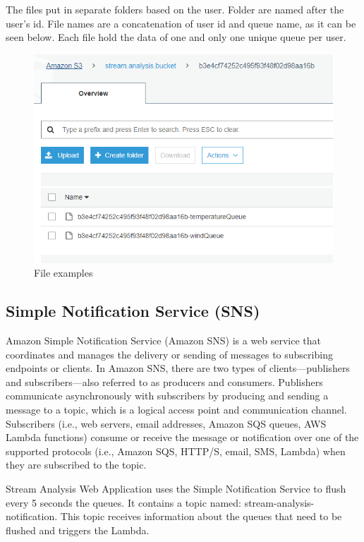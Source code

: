 The files put in separate folders based on the user. Folder are named after the user's id. File names are a concatenation of user id and queue name, as it can be seen below. Each file hold the data of one and only one unique queue per user.

\begin{figure}[h]
	\centering
	\includegraphics[width=1\linewidth]{./images/aws_resources/S3Files.PNG}
	\caption{File examples}
	\label{fig:s3Files}
\end{figure}

\newpage

\subsection{Simple Notification Service (SNS)}
\label{chap:04:03:06}

Amazon Simple Notification Service (Amazon SNS) is a web service that coordinates and manages the delivery or sending of messages to subscribing endpoints or clients. In Amazon SNS, there are two types of clients—publishers and subscribers—also referred to as producers and consumers. Publishers communicate asynchronously with subscribers by producing and sending a message to a topic, which is a logical access point and communication channel. Subscribers (i.e., web servers, email addresses, Amazon SQS queues, AWS Lambda functions) consume or receive the message or notification over one of the supported protocols (i.e., Amazon SQS, HTTP/S, email, SMS, Lambda) when they are subscribed to the topic.\cite{sns}

Stream Analysis Web Application uses the Simple Notification Service to flush every 5 seconds the queues. It contains a topic named: stream-analysis-notification. This topic receives information about the queues that need to be flushed and triggers the Lambda.

